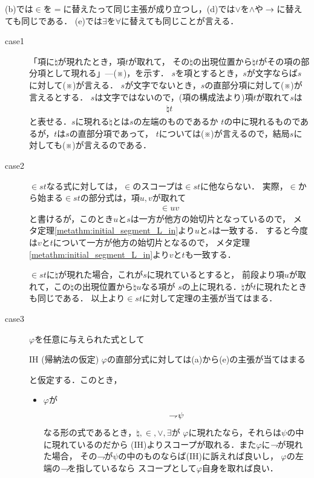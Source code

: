 	(b)では$\in$を$=$に替えたって同じ主張が成り立つし，(d)では$\vee$を$\wedge$や$\hspace{0.25em}\rightarrow\hspace{0.25em}$に替えても同じである．
	(e)では$\exists$を$\forall$に替えても同じことが言える．
	
	\begin{metaprf}\mbox{}
		\begin{description}
			\item[case1]
				「項に$\natural$が現れたとき，項$t$が取れて，
				その$\natural$の出現位置から$\natural t$がその項の部分項として現れる」---(※)，を示す．
				$s$を項とするとき，$s$が文字ならば$s$に対して(※)が言える．
				$s$が文字でないとき，$s$の直部分項に対して(※)が言えるとする．
				$s$は文字ではないので，(項の構成法より)項$t$が取れて$s$は
				\begin{align}
					\natural t
				\end{align}
				と表せる．$s$に現れる$\natural$とは$s$の左端のものであるか
				$t$の中に現れるものであるが，$t$は$s$の直部分項であって，
				$t$については(※)が言えるので，結局$s$に対しても(※)が言えるのである．
			
			
			\item[case2]
				$\in s t$なる式に対しては，$\in$のスコープは$\in s t$に他ならない．
				実際，$\in$から始まる$\in s t$の部分式は，項$u,v$が取れて
				\begin{align}
					\in u v
				\end{align}
				と書けるが，このとき$u$と$s$は一方が他方の始切片となっているので，
				メタ定理\ref{metathm:initial_segment_L_in}より$u$と$s$は一致する．
				すると今度は$v$と$t$について一方が他方の始切片となるので，
				メタ定理\ref{metathm:initial_segment_L_in}より$v$と$t$も一致する．
				
				$\in s t$に$\natural$が現れた場合，これが$s$に現れているとすると，
				前段より項$u$が取れて，この$\natural$の出現位置から$\natural u$なる項が
				$s$の上に現れる．$\natural$が$t$に現れたときも同じである．
				以上より$\in s t$に対して定理の主張が当てはまる．
					
			\item[case3]
				$\varphi$を任意に与えられた式として
				\begin{itembox}[l]{IH (帰納法の仮定)}
					$\varphi$の直部分式に対しては(a)から(e)の主張が当てはまる
				\end{itembox}
				と仮定する．このとき，
				\begin{itemize}
					\item $\varphi$が
						\begin{align}
							\rightharpoondown\hspace{-0.25em} \psi
						\end{align}
						なる形の式であるとき，$\natural,\in,\vee,\exists$が
						$\varphi$に現れたなら，それらは$\psi$の中に現れているのだから
						(IH)よりスコープが取れる．また$\varphi$に$\rightharpoondown\hspace{-0.25em}$が現れた場合，
						その$\rightharpoondown\hspace{-0.25em}$が$\psi$の中のものならば(IH)に訴えれば良いし，
						$\varphi$の左端の$\rightharpoondown\hspace{-0.25em}$を指しているなら
						スコープとして$\varphi$自身を取れば良い．
						

\end{itemize}
\end{description}
\end{metaprf}

